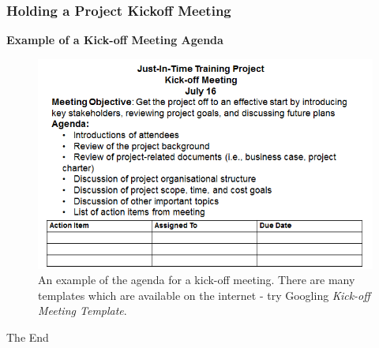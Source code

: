 \documentclass{beamer}
\begin{document}
\begin{frame}
\frametitle{Holding a Project Kickoff Meeting}
\textbf{Example of a Kick-off Meeting Agenda}
\begin{figure}
\includegraphics[scale=0.5]{kick_off}
\caption{An example of the agenda for a kick-off meeting.  There are many templates which are available on the internet - try Googling \textit{Kick-off Meeting Template}.}
\end{figure}
\end{frame}

\begin{frame}
\begin{center}
\huge The End
\end{center}
\end{frame}
\end{document}

